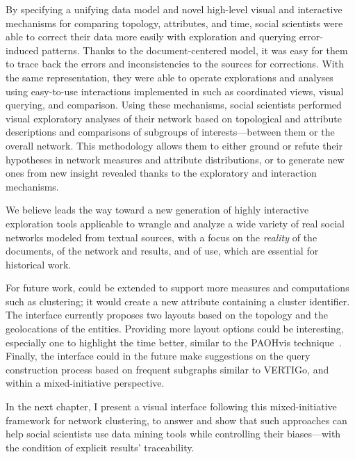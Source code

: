 By specifying a unifying data model and novel high-level visual and interactive mechanisms for comparing topology, attributes, and time, social scientists were able to correct their data more easily with exploration and querying error-induced patterns.
Thanks to the document-centered model, it was easy for them to trace back the errors and inconsistencies to the sources for corrections.
With the same representation, they were able to operate explorations and analyses using easy-to-use interactions implemented in \name such as coordinated views, visual querying, and comparison.
Using these mechanisms, social scientists performed visual exploratory analyses of their network based on topological and attribute descriptions and comparisons of subgroups of interests---between them or the overall network.
This methodology allows them to either ground or refute their hypotheses in network measures and attribute distributions, or to generate new ones from new insight revealed thanks to the exploratory and interaction mechanisms.

We believe \name leads the way toward a new generation of highly interactive exploration tools applicable to wrangle and analyze a wide variety of real social networks modeled from textual sources, with a focus on the \textsl{reality} of the documents, \traceability of the network and results,  and \simplicity of use, which are essential for historical work.

For future work, \name could be extended to support more \sna measures and computations such as clustering; it would create a new attribute containing a cluster identifier.
The interface currently proposes two layouts based on the topology and the geolocations of the entities.
Providing more layout options could be interesting, especially one to highlight the time better, similar to the PAOHvis technique~\cite{valdiviaAnalyzingDynamicHypergraphs2021}.
Finally, the interface could in the future make suggestions on the query construction process based on frequent subgraphs similar to VERTIGo\cite{cuencaVERTIGoVisualPlatform2021}, and within a mixed-initiative perspective\cite{makoninMixedInitiativeBigData2016}.

In the next chapter, I present a visual interface following this mixed-initiative framework for network clustering, to answer \qthree and show that such approaches can help social scientists use data mining tools while controlling their biases---with the condition of explicit results' traceability.



